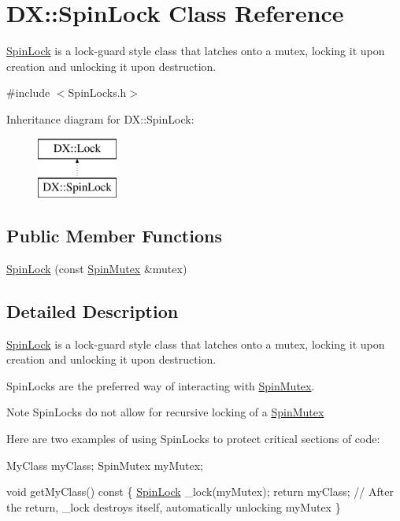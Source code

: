 \hypertarget{class_d_x_1_1_spin_lock}{\section{D\-X\-:\-:Spin\-Lock Class Reference}
\label{class_d_x_1_1_spin_lock}
}


\hyperlink{class_d_x_1_1_spin_lock}{Spin\-Lock} is a lock-\/guard style class that latches onto a mutex, locking it upon creation and unlocking it upon destruction.  




{\ttfamily \#include $<$Spin\-Locks.\-h$>$}

Inheritance diagram for D\-X\-:\-:Spin\-Lock\-:\begin{figure}[H]
\begin{center}
\leavevmode
\includegraphics[height=2.000000cm]{class_d_x_1_1_spin_lock}
\end{center}
\end{figure}
\subsection*{Public Member Functions}
\begin{DoxyCompactItemize}
\item 
\hyperlink{class_d_x_1_1_spin_lock_a338ff0b08d3517e734fbf190bfff7e24}{Spin\-Lock} (const \hyperlink{class_d_x_1_1_spin_mutex}{Spin\-Mutex} \&mutex)
\end{DoxyCompactItemize}


\subsection{Detailed Description}
\hyperlink{class_d_x_1_1_spin_lock}{Spin\-Lock} is a lock-\/guard style class that latches onto a mutex, locking it upon creation and unlocking it upon destruction. 

Spin\-Locks are the preferred way of interacting with \hyperlink{class_d_x_1_1_spin_mutex}{Spin\-Mutex}.

\begin{DoxyNote}{Note}
Spin\-Locks do not allow for recursive locking of a \hyperlink{class_d_x_1_1_spin_mutex}{Spin\-Mutex}
\end{DoxyNote}
Here are two examples of using Spin\-Locks to protect critical sections of code\-: 
\begin{DoxyCode}
MyClass myClass;
SpinMutex myMutex;

\textcolor{keywordtype}{void} getMyClass()\textcolor{keyword}{ const}
\textcolor{keyword}{}\{
    \hyperlink{class_d_x_1_1_spin_lock_a338ff0b08d3517e734fbf190bfff7e24}{SpinLock} \_lock(myMutex);
    \textcolor{keywordflow}{return} myClass; \textcolor{comment}{// After the return, \_lock destroys itself, automatically unlocking myMutex}
\}
\end{DoxyCode}



